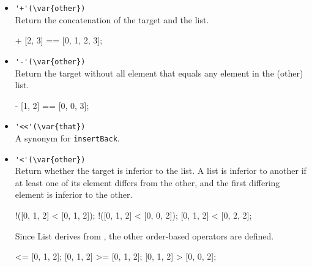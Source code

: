 \begin{itemize}
\begin{urbiscript}[firstnumber=last]
var l = [[]] * 3;
[00000000] [[], [], []]
l[0] << 1;
[00000000] [1]
l;
[00000000] [[1], [1], [1]]
\end{urbiscript}

\item \lstinline|'+'(\var{other})|\\
Return the concatenation of the target and the  list.

\begin{urbiassert}[firstnumber=last]
[0, 1] + [2, 3] == [0, 1, 2, 3];
\end{urbiassert}

\item \lstinline|'-'(\var{other})|\\
Return the target without all element that equals any element in the
\var(other) list.

\begin{urbiassert}[firstnumber=last]
[0, 1, 0, 2, 3] - [1, 2] == [0, 0, 3];
\end{urbiassert}

\item \lstinline|'<<'(\var{that})|\\
  A synonym for \lstinline|insertBack|.

\item \lstinline|'<'(\var{other})|\\
  Return whether the target is inferior to the  list. A
  list is inferior to another if at least one of its element differs
  from the other, and the first differing element is inferior to the
  other.

\begin{urbiassert}[firstnumber=last]
!([0, 1, 2] < [0, 1, 2]);
!([0, 1, 2] < [0, 0, 2]);
[0, 1, 2] < [0, 2, 2];
\end{urbiassert}

  Since List derives from , the other order-based
  operators are defined.

\begin{urbiassert}[firstnumber=last]
 [0, 1, 2] <= [0, 1, 2];
 [0, 1, 2] >= [0, 1, 2];
 [0, 1, 2] >  [0, 0, 2];
\end{urbiassert}
\end{itemize}


